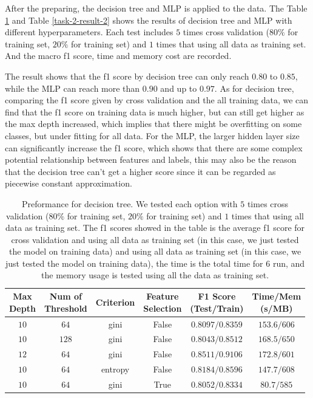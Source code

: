 \documentclass[11pt]{article}
\begin{document}
After the preparing, the decision tree and MLP is applied to the data. The Table \ref{task-2-result-1} and Table \ref{task-2-result-2} shows the results of decision tree and MLP with different hyperparameters. Each test includes $5$ times cross validation ($80\%$ for training set, $20\%$ for training set) and $1$ times that using all data as training set. And the macro f1 score, time and memory cost are recorded.

The result shows that the f1 score by decision tree can only reach $0.80$ to $0.85$, while the MLP can reach more than $0.90$ and up to $0.97$. As for decision tree, comparing the f1 score given by cross validation and the all training data, we can find that the f1 score on training data is much higher, but can still get higher as the max depth increased, which implies that there might be overfitting on some classes, but under fitting for all data. For the MLP, the larger hidden layer size can significantly increase the f1 score, which shows that there are some complex potential relationship between features and labels, this may also be the reason that the decision tree can't get a higher score since it can be regarded as piecewise constant approximation.

\begin{table}[H]
  \centering
  \begin{tabular}{|c|c|c|c|c|c|}
    \hline
    \makecell{Max                                                  \\Depth} & \makecell{Num of                                                          \\ Threshold} & Criterion & \makecell{Feature \\ Selection}& \makecell{F1 Score \\ (Test/Train)} & \makecell{Time/Mem \\ (s/MB)}               \\
    \hline
    $10$ & $64$  & gini    & False & $0.8097/0.8359$ & $153.6/606$ \\
    \hline
    $10$ & $128$ & gini    & False & $0.8043/0.8512$ & $168.5/650$ \\
    \hline
    $12$ & $64$  & gini    & False & $0.8511/0.9106$ & $172.8/601$ \\
    \hline
    $10$ & $64$  & entropy & False & $0.8184/0.8596$ & $147.7/608$ \\
    \hline
    $10$ & $64$  & gini    & True  & $0.8052/0.8334$ & $80.7/585$  \\
    \hline
  \end{tabular}
  \caption{Preformance for decision tree. We tested each option with $5$ times cross validation ($80\%$ for training set, $20\%$ for training set) and $1$ times that using all data as training set. The f1 scores showed in the table is the average f1 score for cross validation and using all data as training set (in this case, we just tested the model on training data) and using all data as training set (in this case, we just tested the model on training data), the time is the total time for $6$ run, and the memory usage is tested using all the data as training set.}
  \label{task-2-result-1}
\end{table}
\end{document}
